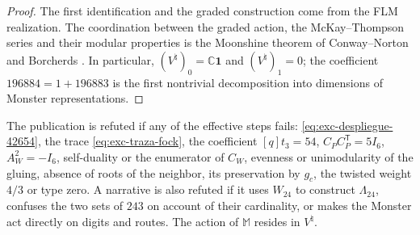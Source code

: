 \begin{proof}
The first identification and the graded construction come from the
FLM realization. The coordination between the graded action, the McKay--Thompson
series and their modular properties is the Moonshine theorem of
Conway--Norton and Borcherds
\citep{FLM1988,ConwayNorton1979,Borcherds1992}. In particular,
\((V^\natural)_0=\mathbb C\mathbf1\) and
\((V^\natural)_1=0\); the coefficient \(196884=1+196883\) is the first
nontrivial decomposition into dimensions of Monster representations.
\end{proof}

\begin{falsifier}
\label{fals:exc-corredor}
The publication is refuted if any of the effective steps fails:
\eqref{eq:exc-despliegue-42654}, the trace
\eqref{eq:exc-traza-fock}, the coefficient \([q]t_3=54\),
\(C_PC_P^{\mathsf T}=5I_6\), \(A_W^2=-I_6\), self-duality or the
enumerator of \(C_W\), evenness or unimodularity of the gluing, absence
of roots of the neighbor, its preservation by \(g_c\), the twisted weight
\(4/3\) or type zero. A narrative is also refuted if it uses
\(W_{24}\) to construct \(\Lambda_{24}\), confuses the two sets
of \(243\) on account of their cardinality, or makes the Monster act directly
on digits and routes. The action of \(\mathbb M\) resides in \(V^\natural\).
\end{falsifier}
